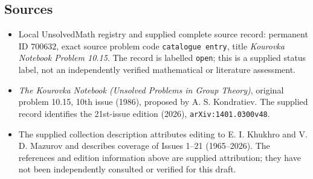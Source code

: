 \documentclass[11pt]{article}
\begin{document}
\subsection{Sources}
\begin{itemize}
\item Local UnsolvedMath registry and supplied complete source record: permanent ID \(700632\), exact source problem code \texttt{catalogue entry}, title \emph{Kourovka Notebook Problem 10.15}. The record is labelled \texttt{open}; this is a supplied status label, not an independently verified mathematical or literature assessment.
\item \emph{The Kourovka Notebook (Unsolved Problems in Group Theory)}, original problem 10.15, 10th issue (1986), proposed by A. S. Kondratiev. The supplied record identifies the 21st-issue edition (2026), \texttt{arXiv:1401.0300v48}.
\item The supplied collection description attributes editing to E. I. Khukhro and V. D. Mazurov and describes coverage of Issues 1--21 (1965--2026). The references and edition information above are supplied attribution; they have not been independently consulted or verified for this draft.
\end{itemize}
\end{document}
